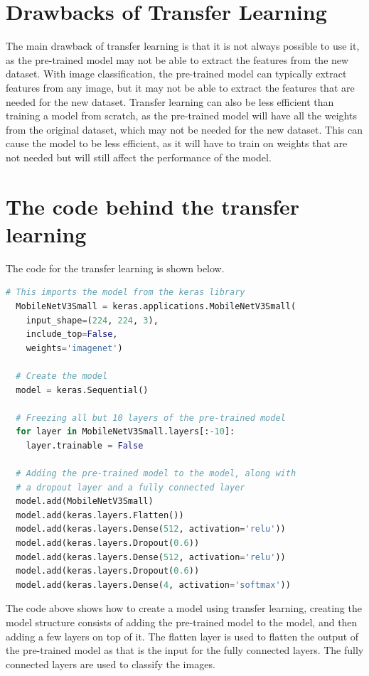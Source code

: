 \documentclass[]{final_report}
\begin{document}
\section{Drawbacks of Transfer Learning}
The main drawback of transfer learning is that it is not always possible to use it,
as the pre-trained model may not be able to extract the features from the new dataset.
With image classification, the pre-trained model can typically extract features from any image, but it may not be able to extract the features that are needed for the new dataset.
Transfer learning can also be less efficient than training a model from scratch, 
as the pre-trained model will have all the weights from the original dataset, which may not be needed for the new dataset.
This can cause the model to be less efficient, as it will have to train on weights that are not 
needed but will still affect the performance of the model.

\pagebreak
\section{The code behind the transfer learning}
The code for the transfer learning is shown below.

\begin{lstlisting}[language=Python]
  # This imports the model from the keras library
  MobileNetV3Small = keras.applications.MobileNetV3Small(
    input_shape=(224, 224, 3),
    include_top=False, 
    weights='imagenet')

  # Create the model
  model = keras.Sequential()

  # Freezing all but 10 layers of the pre-trained model
  for layer in MobileNetV3Small.layers[:-10]:
    layer.trainable = False

  # Adding the pre-trained model to the model, along with 
  # a dropout layer and a fully connected layer
  model.add(MobileNetV3Small)
  model.add(keras.layers.Flatten())
  model.add(keras.layers.Dense(512, activation='relu'))
  model.add(keras.layers.Dropout(0.6))
  model.add(keras.layers.Dense(512, activation='relu'))
  model.add(keras.layers.Dropout(0.6))
  model.add(keras.layers.Dense(4, activation='softmax'))
\end{lstlisting}

The code above shows how to create a model using transfer learning,
creating the model structure consists of adding the pre-trained model to the model, 
and then adding a few layers on top of it. The flatten layer is used to flatten the output of the pre-trained model
as that is the input for the fully connected layers. The fully connected layers are used to classify the images.
\end{document}
